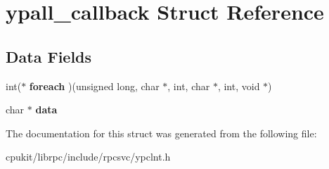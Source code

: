 \hypertarget{structypall__callback}{}\section{ypall\+\_\+callback Struct Reference}
\label{structypall__callback}
\subsection*{Data Fields}
\begin{DoxyCompactItemize}
\item 
\mbox{\label{structypall__callback_ac14249d8bf6668af1d1becf61cb98240}} 
int($\ast$ {\bfseries foreach} )(unsigned long, char $\ast$, int, char $\ast$, int, void $\ast$)
\item 
\mbox{\label{structypall__callback_ad2943afe7376b72a29a305e89c312720}} 
char $\ast$ {\bfseries data}
\end{DoxyCompactItemize}


The documentation for this struct was generated from the following file\+:\begin{DoxyCompactItemize}
\item 
cpukit/librpc/include/rpcsvc/ypclnt.\+h\end{DoxyCompactItemize}
